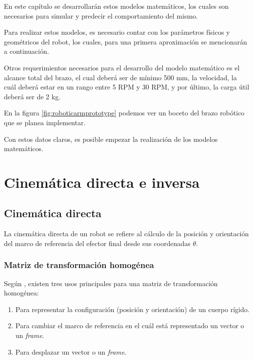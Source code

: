 En este capítulo se desarrollarán estos modelos matemáticos, los cuales son necesarios para simular y predecir el comportamiento del mismo. 

Para realizar estos modelos, es necesario contar con los parámetros físicos y geométricos del robot, los cuales, para una primera aproximación se mencionarán a continuación.


Otros requerimientos necesarios para el desarrollo del modelo matemático es el alcance total del brazo, el cual deberá ser de mínimo 500 mm, la velocidad, la cuál deberá estar en un rango entre 5 RPM y 30 RPM, y por último, la carga útil deberá ser de 2 kg.

En la figura \ref{fig:roboticarmprototype} podemos ver un boceto del brazo robótico que se planea implementar.

Con estos datos claros, es posible empezar la realización de los modelos matemáticos.

\section{Cinemática directa e inversa}
\subsection{Cinemática directa}

La cinemática directa de un robot se refiere al cálculo de la posición y orientación del marco de referencia del efector final desde sus coordenadas $\theta$. \cite{University2017}

\subsubsection{Matriz de transformación homogénea}

Según \cite{University2017}, existen tres usos principales para una matriz de transformación homogénea:

\begin{enumerate}
  \item Para representar la configuración (posición y orientación) de un cuerpo rígido.
  \item Para cambiar el marco de referencia en el cuál está representado un vector o un \textit{frame}.
  \item Para desplazar un vector o un \textit{frame}.
\end{enumerate}

